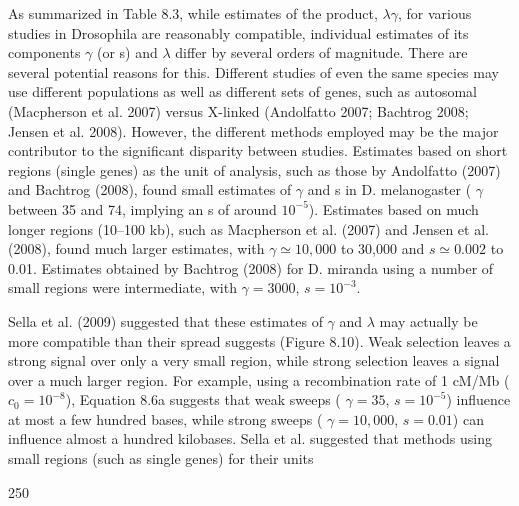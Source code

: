 \documentclass{article}
\begin{document}
As summarized in Table 8.3, while estimates of the product,  $ \lambda\gamma $, for various studies in Drosophila are reasonably compatible, individual estimates of its components  $ \gamma $ (or s) and  $ \lambda $ differ by several orders of magnitude. There are several potential reasons for this. Different studies of even the same species may use different populations as well as different sets of genes, such as autosomal (Macpherson et al. 2007) versus X-linked (Andolfatto 2007; Bachtrog 2008; Jensen et al. 2008). However, the different methods employed may be the major contributor to the significant disparity between studies. Estimates based on short regions (single genes) as the unit of analysis, such as those by Andolfatto (2007) and Bachtrog (2008), found small estimates of  $ \gamma $ and s in D. melanogaster ( $ \gamma $ between 35 and 74, implying an s of around  $ 10^{-5} $). Estimates based on much longer regions (10–100 kb), such as Macpherson et al. (2007) and Jensen et al. (2008), found much larger estimates, with  $ \gamma \simeq 10,000 $ to 30,000 and  $ s \simeq 0.002 $ to 0.01. Estimates obtained by Bachtrog (2008) for D. miranda using a number of small regions were intermediate, with  $ \gamma = 3000 $,  $ s = 10^{-3} $.

Sella et al. (2009) suggested that these estimates of  $ \gamma $ and  $ \lambda $ may actually be more compatible than their spread suggests (Figure 8.10). Weak selection leaves a strong signal over only a very small region, while strong selection leaves a signal over a much larger region. For example, using a recombination rate of 1 cM/Mb ( $ c_0 = 10^{-8} $), Equation 8.6a suggests that weak sweeps ( $ \gamma = 35 $,  $ s = 10^{-5} $) influence at most a few hundred bases, while strong sweeps ( $ \gamma = 10,000 $,  $ s = 0.01 $) can influence almost a hundred kilobases. Sella et al. suggested that methods using small regions (such as single genes) for their units

250
\end{document}
